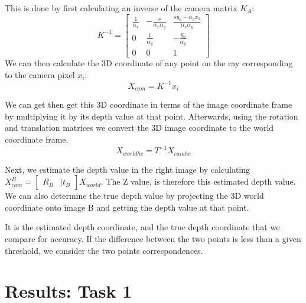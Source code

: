 \documentclass{article}
\begin{document}
This is done by first calculating an inverse of the camera matrix $K_A$:
\[K^{-1} = 
    \begin{bmatrix}
        \frac{1}{\alpha_x} & -\frac{s}{\alpha_x\alpha_y} & \frac{sy_0-\alpha_yx_0}{\alpha_x\alpha_y} \\
        0 & \frac{1}{\alpha_y} & -\frac{y_0}{\alpha_y} \\ 
        0 & 0 & 1
    \end{bmatrix}
\]
We can then calculate the 3D coordinate of any point on the ray corresponding to the camera pixel $x_i$: 
\[X_{cam} = K^{-1} x_i\]

We can get then get this 3D coordinate in terms of the image coordinate frame by multiplying it by its depth value at that point. Afterwards,
using the rotation and translation matrices we convert the 3D image coordinate to the world coordinate frame.
\[X_{worldhc} = T^{-1}X_{camhc}\]

Next, we estimate the depth value in the right image by calculating \(X_{cam}^B = \begin{bmatrix}R_B & | t_B \end{bmatrix}X_{world}\). The Z value, is therefore
this estimated depth value. We can also determine the true depth value by projecting the 3D world coordinate onto image B and getting the depth 
value at that point.

It is the estimated depth coordinate, and the true depth coordinate that we compare for accuracy. If the difference between the two points is less than
a given threshold, we consider the two points correspondences.

\section{Results: Task 1}
\end{document}
